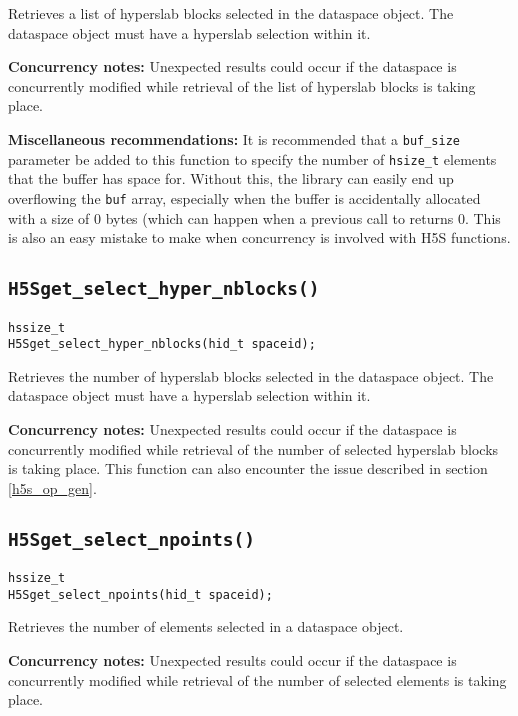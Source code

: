 \documentclass[../HDF5_RFC.tex]{subfiles}
\begin{document}
Retrieves a list of hyperslab blocks selected in the dataspace object. The dataspace object
must have a hyperslab selection within it.

\textbf{Concurrency notes:} Unexpected results could occur if the dataspace is concurrently
modified while retrieval of the list of hyperslab blocks is taking place.

\textbf{Miscellaneous recommendations:} It is recommended that a \texttt{buf\_size} parameter
be added to this function to specify the number of \texttt{hsize\_t} elements that the buffer
has space for. Without this, the library can easily end up overflowing the \texttt{buf} array,
especially when the buffer is accidentally allocated with a size of 0 bytes (which can happen
when a previous call to  returns 0. This is
also an easy mistake to make when concurrency is involved with H5S functions.

\subsection{\texttt{H5Sget\_select\_hyper\_nblocks()}}
\label{apdx:h5s_func_h5sget_select_hyper_nblocks}

\begin{verbatim}
hssize_t
H5Sget_select_hyper_nblocks(hid_t spaceid);
\end{verbatim}

Retrieves the number of hyperslab blocks selected in the dataspace object. The dataspace
object must have a hyperslab selection within it.

\textbf{Concurrency notes:} Unexpected results could occur if the dataspace is concurrently
modified while retrieval of the number of selected hyperslab blocks is taking place. This
function can also encounter the issue described in section \ref{h5s_op_gen}.

\subsection{\texttt{H5Sget\_select\_npoints()}}
\label{apdx:h5s_func_h5sget_select_npoints}

\begin{verbatim}
hssize_t
H5Sget_select_npoints(hid_t spaceid);
\end{verbatim}

Retrieves the number of elements selected in a dataspace object.

\textbf{Concurrency notes:} Unexpected results could occur if the dataspace is concurrently
modified while retrieval of the number of selected elements is taking place.
\end{document}
